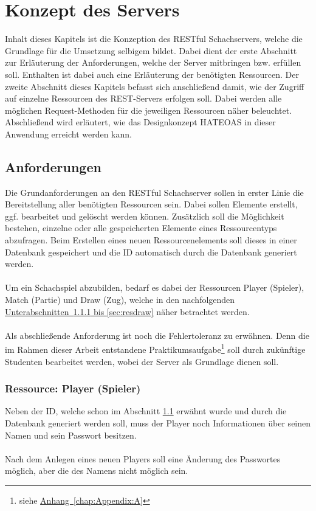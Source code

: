 
\chapter{Konzept des Servers}\label{sec:conceptServer}
Inhalt dieses Kapitels ist die Konzeption des RESTful Schachservers, welche die Grundlage für die Umsetzung selbigem bildet. Dabei dient der erste Abschnitt zur Erläuterung der Anforderungen, welche der Server mitbringen bzw. erfüllen soll. Enthalten ist dabei auch eine Erläuterung der benötigten Ressourcen. Der zweite Abschnitt dieses Kapitels befasst sich anschließend damit, wie der Zugriff auf einzelne Ressourcen des \gls{REST}-Servers erfolgen soll. Dabei werden alle möglichen Request-Methoden für die jeweiligen Ressourcen näher beleuchtet. Abschließend wird erläutert, wie das Designkonzept HATEOAS in dieser Anwendung erreicht werden kann.

\section{Anforderungen}\label{sec:anforderungen}
Die Grundanforderungen an den RESTful Schachserver sollen in erster Linie die Bereitstellung aller benötigten Ressourcen sein. Dabei sollen Elemente erstellt, ggf. bearbeitet und gelöscht werden können. Zusätzlich soll die Möglichkeit bestehen, einzelne oder alle gespeicherten Elemente eines Ressourcentyps abzufragen. Beim Erstellen eines neuen Ressourcenelements soll dieses in einer Datenbank gespeichert und die ID automatisch durch die Datenbank generiert werden.\\
\\
Um ein Schachspiel abzubilden, bedarf es dabei der Ressourcen Player (Spieler), Match (Partie) und Draw (Zug), welche in den nachfolgenden \hyperref[sec:resplayer, sec:resdraw]{Unterabschnitten~\ref{sec:resplayer} bis \ref{sec:resdraw}} näher betrachtet werden.\\
\\
Als abschließende Anforderung ist noch die Fehlertoleranz zu erwähnen. Denn die im Rahmen dieser Arbeit entstandene Praktikumsaufgabe\footnote{siehe \hyperref[chap:Appendix:A]{Anhang~\ref{chap:Appendix:A}}} soll durch zukünftige Studenten bearbeitet werden, wobei der Server als Grundlage dienen soll.

\subsection{Ressource: Player (Spieler)}\label{sec:resplayer}
Neben der ID, welche schon im Abschnitt \ref{sec:anforderungen} erwähnt wurde und durch die Datenbank generiert werden soll, muss der Player noch Informationen über seinen Namen und sein Passwort besitzen.\\
\\
Nach dem Anlegen eines neuen Players soll eine Änderung des Passwortes möglich, aber die des Namens nicht möglich sein.

